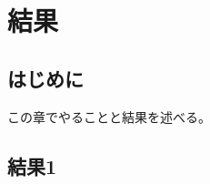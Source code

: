\documentclass[thesis]{subfiles}
\begin{document}
\chapter{結果}
\section{はじめに}
この章でやることと結果を述べる。
\section{結果1}
\end{document}
